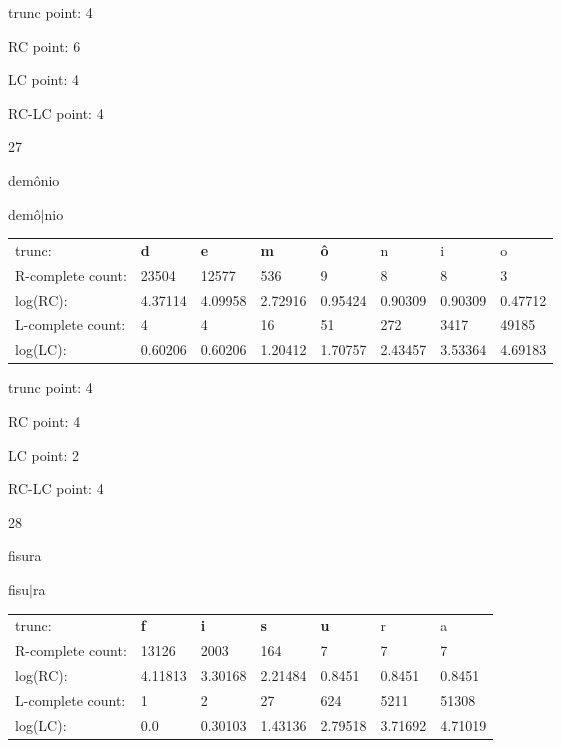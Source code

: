 \documentclass{article}
\begin{document}
trunc point: 4

RC point: 6

LC point: 4

RC-LC point: 4

\vspace{3em}



27

demônio

demô$|$nio

\vspace{1em}

\begin{tabular}{l|lllllll}

trunc: & {\color{red}\bf d} & {\color{red}\bf e} & {\color{red}\bf m} & {\color{red}\bf ô} & n & i & o \\ 
R-complete count: & 23504 & 12577 & 536 & 9 & 8 & 8 & 3 \\ 
log(RC): & 4.37114 & 4.09958 & 2.72916 & 0.95424 & 0.90309 & 0.90309 & 0.47712 \\ 
L-complete count: & 4 & 4 & 16 & 51 & 272 & 3417 & 49185 \\ 
log(LC): & 0.60206 & 0.60206 & 1.20412 & 1.70757 & 2.43457 & 3.53364 & 4.69183 \\ 
\end{tabular}

trunc point: 4

RC point: 4

LC point: 2

RC-LC point: 4

\vspace{3em}



28

fisura

fisu$|$ra

\vspace{1em}

\begin{tabular}{l|llllll}

trunc: & {\color{red}\bf f} & {\color{red}\bf i} & {\color{red}\bf s} & {\color{red}\bf u} & r & a \\ 
R-complete count: & 13126 & 2003 & 164 & 7 & 7 & 7 \\ 
log(RC): & 4.11813 & 3.30168 & 2.21484 & 0.8451 & 0.8451 & 0.8451 \\ 
L-complete count: & 1 & 2 & 27 & 624 & 5211 & 51308 \\ 
log(LC): & 0.0 & 0.30103 & 1.43136 & 2.79518 & 3.71692 & 4.71019 \\ 
\end{tabular}
\end{document}

